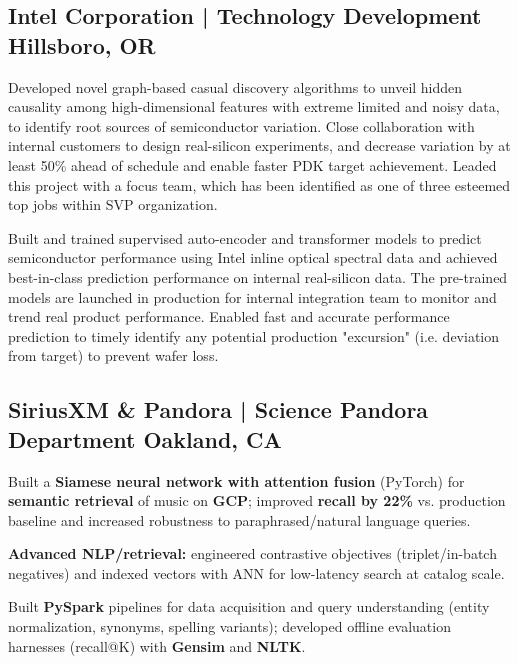 \documentclass[]{Keval-resume}
\begin{document}
\subsection{Intel Corporation | Technology Development \hfill \normalfont H\lowercase{illsboro}, OR}
\begin{cvitems}
\item 
     {Developed novel graph-based casual discovery algorithms to unveil hidden causality among high-dimensional features with extreme limited and noisy data, to identify root sources of semiconductor variation. Close collaboration with internal customers to design real-silicon experiments, and decrease variation by at least 50\% ahead of schedule and enable faster PDK target achievement. Leaded this project with a focus team, which has been identified as one of three esteemed top jobs within SVP organization.
    }
\item
    {
    Built and trained supervised auto-encoder and transformer models to predict semiconductor performance using Intel inline optical spectral data and achieved best-in-class prediction performance on internal real-silicon data. The pre-trained models are launched in production for internal integration team to monitor and trend real product performance. Enabled fast and accurate performance prediction to timely identify any potential production "excursion" (i.e. deviation from target) to prevent wafer loss.
    }
\end{cvitems}
\sectionsep

\subsection{SiriusXM \& Pandora | Science Pandora Department \hfill \normalfont O\lowercase{akland}, CA}
\begin{cvitems}
\item 
    {Built a \textbf{Siamese neural network with attention fusion} (PyTorch) for \textbf{semantic retrieval} of music on \textbf{GCP}; improved \textbf{recall by 22\%} vs. production baseline and increased robustness to paraphrased/natural language queries.}
\item
    {\textbf{Advanced NLP/retrieval:} engineered contrastive objectives (triplet/in-batch negatives) and indexed vectors with ANN for low-latency search at catalog scale.}
\item 
    {Built \textbf{PySpark} pipelines for data acquisition and query understanding (entity normalization, synonyms, spelling variants); developed offline evaluation harnesses (recall@K) with \textbf{Gensim} and \textbf{NLTK}.}
\end{cvitems}
\sectionsep
\end{document}
